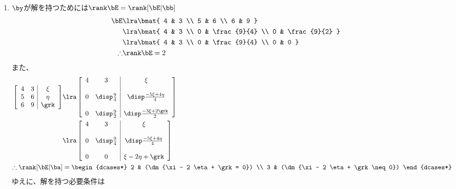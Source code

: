 \begin{ans*}
\begin{enumerate}[label=(\arabic*)]
    \item $\by$が解を持つためには$\rank \bE = \rank [\bE|\bb]$
    \begin{align}
      \bE
      &\lra \bmat{
        4 & 3 \\
        5 & 6 \\
        6 & 9
      } \\
      &\lra \bmat{
        4 & 3 \\
        0 & \frac{9}{4} \\
        0 & \frac{9}{2}
      } \\
      &\lra \bmat{
        4 & 3 \\
        0 & \frac{9}{4} \\
        0 & 0
      } \\
      \therefore & \rank \bE = 2
    \end{align}
    また、
    \begin{align}
      \left[\begin{array}{cc|c}
        4 & 3 & \xi \\
        5 & 6 & \eta \\
        6 & 9 & \grk
      \end{array}\right]
      &\lra \left[\begin{array}{cc|c}
        4 & 3 & \xi \\
        &&\\
        0 & \disp\frac{9}{4} & \disp\frac{-5 \xi + 4\eta}{4} \\
        &&\\
        0 & \disp\frac{9}{2} & \disp\frac{-3 \xi + 2\grk}{2}
      \end{array}\right] \\
      &\lra \left[\begin{array}{cc|c}
        4 & 3 & \xi \\
        &&\\
        0 & \disp\frac{9}{4} & \disp\frac{-5 \xi + 4\eta}{4} \\
        &&\\
        0 & 0 & \xi - 2\eta + \grk
      \end{array}\right] \\
      \therefore\rank[\bE|\ba]&=
      \begin{dcases*}
        2 & (\dm{\xi - 2 \eta + \grk = 0}) \\
        3 & (\dm{\xi - 2 \eta + \grk \neq 0})
      \end{dcases*}
    \end{align}
    ゆえに、解を持つ必要条件は
  \end{enumerate}
\end{ans*}
